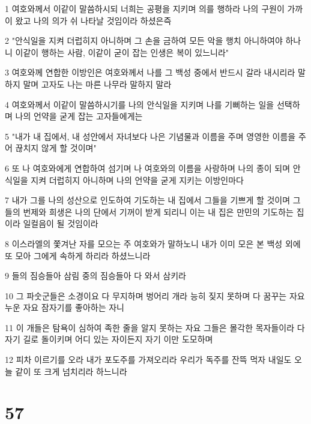 \par 1 여호와께서 이같이 말씀하시되 너희는 공평을 지키며 의를 행하라 나의 구원이 가까이 왔고 나의 의가 쉬 나타날 것임이라 하셨은즉
\par 2 "안식일을 지켜 더럽히지 아니하며 그 손을 금하여 모든 악을 행치 아니하여야 하나니 이같이 행하는 사람, 이같이 굳이 잡는 인생은 복이 있느니라"
\par 3 여호와께 연합한 이방인은 여호와께서 나를 그 백성 중에서 반드시 갈라 내시리라 말하지 말며 고자도 나는 마른 나무라 말하지 말라
\par 4 여호와께서 이같이 말씀하시기를 나의 안식일을 지키며 나를 기뻐하는 일을 선택하며 나의 언약을 굳게 잡는 고자들에게는
\par 5 "내가 내 집에서, 내 성안에서 자녀보다 나은 기념물과 이름을 주며 영영한 이름을 주어 끊치지 않게 할 것이며"
\par 6 또 나 여호와에게 연합하여 섬기며 나 여호와의 이름을 사랑하며 나의 종이 되며 안식일을 지켜 더럽히지 아니하며 나의 언약을 굳게 지키는 이방인마다
\par 7 내가 그를 나의 성산으로 인도하여 기도하는 내 집에서 그들을 기쁘게 할 것이며 그들의 번제와 희생은 나의 단에서 기꺼이 받게 되리니 이는 내 집은 만민의 기도하는 집이라 일컬음이 될 것임이라
\par 8 이스라엘의 쫓겨난 자를 모으는 주 여호와가 말하노니 내가 이미 모은 본 백성 외에 또 모아 그에게 속하게 하리라 하셨느니라
\par 9 들의 짐승들아 삼림 중의 짐승들아 다 와서 삼키라
\par 10 그 파숫군들은 소경이요 다 무지하며 벙어리 개라 능히 짖지 못하며 다 꿈꾸는 자요 누운 자요 잠자기를 좋아하는 자니
\par 11 이 개들은 탐욕이 심하여 족한 줄을 알지 못하는 자요 그들은 몰각한 목자들이라 다 자기 길로 돌이키며 어디 있는 자이든지 자기 이만 도모하며
\par 12 피차 이르기를 오라 내가 포도주를 가져오리라 우리가 독주를 잔뜩 먹자 내일도 오늘 같이 또 크게 넘치리라 하느니라

\chapter{57}

